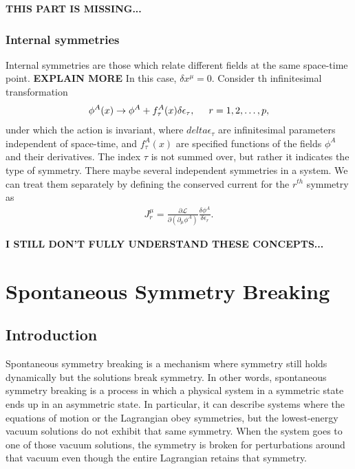 \documentclass[a4paper,11pt]{article}
\numberwithin{equation}{section}
\theoremstyle{definition}
\newcommand{\p}{\partial}
\newcommand{\lag}{\mathcal{L}}
\begin{document}
\textbf{THIS PART IS MISSING...}







\subsubsection{Internal symmetries}

Internal symmetries are those which relate different fields at the same space-time point. \textbf{EXPLAIN MORE} In this case, $\delta x^\mu = 0$. Consider th infinitesimal transformation
\begin{align}
\phi^A(x) \to \phi^A + f^A_\tau(x)\delta \epsilon_\tau, \hspace{0.5cm}r=1,2,\dots,p,
\end{align}
under which the action is invariant, where $delta \epsilon_\tau$ are infinitesimal parameters independent of space-time, and $f^A_\tau(x)$ are specified functions of the fields $\phi^A$ and their derivatives. The index $\tau$ is not summed over, but rather it indicates the type of symmetry. There maybe several independent symmetries in a system. We can treat them separately by defining the conserved current for the $r^{th}$ symmetry as
\begin{align}
J^\mu_r = \frac{\p \lag}{\p (\p_\mu\phi^A)}\frac{\delta \phi^A}{\delta \epsilon_r}.
\end{align}

\textbf{I STILL DON'T FULLY UNDERSTAND THESE CONCEPTS...}






















\newpage


\section{Spontaneous Symmetry Breaking}
\subsection{Introduction}
Spontaneous symmetry breaking is a mechanism where symmetry still holds dynamically but the solutions break symmetry. In other words, spontaneous symmetry breaking is a process in which a physical system in a symmetric state ends up in an asymmetric state. In particular, it can describe systems where the equations of motion or the Lagrangian obey symmetries, but the lowest-energy vacuum solutions do not exhibit that same symmetry. When the system goes to one of those vacuum solutions, the symmetry is broken for perturbations around that vacuum even though the entire Lagrangian retains that symmetry.\\
\end{document}
